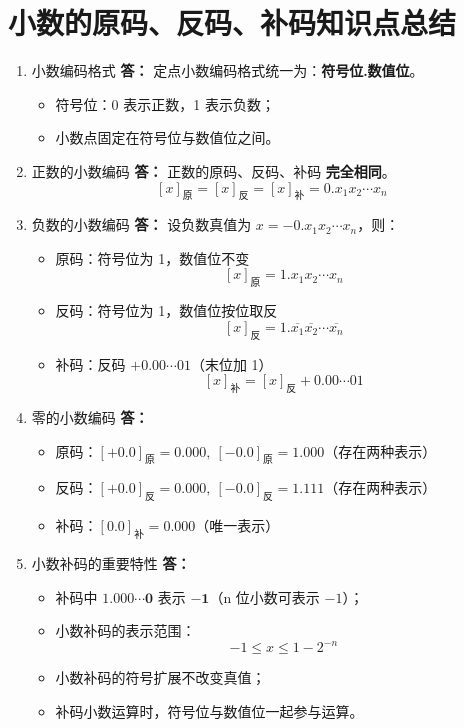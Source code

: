 \documentclass{article}
\begin{document}
\section{小数的原码、反码、补码知识点总结}

\begin{enumerate}[label=\textbf{\arabic*}.]
    \item 小数编码格式
    \textbf{答：}
    定点小数编码格式统一为：\textbf{符号位.数值位}。
    \begin{itemize}
        \item 符号位：0 表示正数，1 表示负数；
        \item 小数点固定在符号位与数值位之间。
    \end{itemize}

    \item 正数的小数编码
    \textbf{答：}
    正数的原码、反码、补码 \textbf{完全相同}。
    \[
    [x]_{\text{原}} = [x]_{\text{反}} = [x]_{\text{补}} = 0.x_1x_2\cdots x_n
    \]

    \item 负数的小数编码
    \textbf{答：}
    设负数真值为 $x = -0.x_1x_2\cdots x_n$，则：
    \begin{itemize}
        \item 原码：符号位为 1，数值位不变
        \[[x]_{\text{原}} = 1.x_1x_2\cdots x_n\]
        \item 反码：符号位为 1，数值位按位取反
        \[[x]_{\text{反}} = 1.\overline{x_1}\overline{x_2}\cdots\overline{x_n}\]
        \item 补码：反码 $+ 0.00\cdots01$（末位加 1）
        \[[x]_{\text{补}} = [x]_{\text{反}} + 0.00\cdots01\]
    \end{itemize}

    \item 零的小数编码
    \textbf{答：}
    \begin{itemize}
        \item 原码：$[+0.0]_{\text{原}}=0.000,\ [-0.0]_{\text{原}}=1.000$（存在两种表示）
        \item 反码：$[+0.0]_{\text{反}}=0.000,\ [-0.0]_{\text{反}}=1.111$（存在两种表示）
        \item 补码：$[0.0]_{\text{补}}=0.000$（唯一表示）
    \end{itemize}

    \item 小数补码的重要特性
    \textbf{答：}
    \begin{itemize}
        \item 补码中 $\boldsymbol{1.000\cdots0}$ 表示 $\boldsymbol{-1}$（n 位小数可表示 $-1$）；
        \item 小数补码的表示范围：
        \[
        -1 \le x \le 1 - 2^{-n}
        \]
        \item 小数补码的符号扩展不改变真值；
        \item 补码小数运算时，符号位与数值位一起参与运算。
    \end{itemize}


\end{enumerate}
\end{document}

